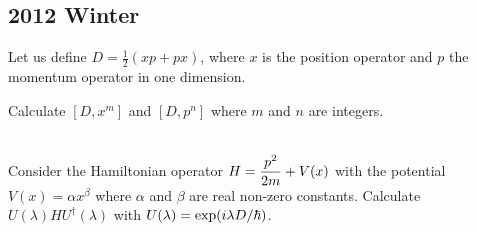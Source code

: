 \documentclass[11pt,letterpaper]{article}
\begin{document}
\phantom{}
\subsection*{2012 Winter}
\phantom{}
	\benum
		\item
		Let us define $D = \frac 12(xp+px)$, where $x$ is the position operator and $p$ the momentum operator in one dimension.
		\benum
			\item
			Calculate $[D,x^m]$ and $[D,p^n]$ where $m$ and $n$ are integers.
			\\
			\\
	
			\item
			Consider the Hamiltonian operator $\displaystyle H = \frac{p^2}{2m}+V(x)$ with the potential $V(x) = \alpha x^\beta$ where $\alpha$ and 
			$\beta$ are real non-zero constants. Calculate $U(\lambda)HU^\dag(\lambda)$ with $U(\lambda) = \exp(i\lambda D/\hbar)$.
	
\end{document}
